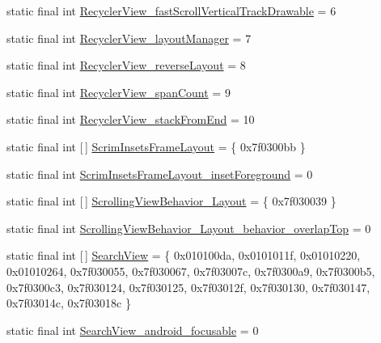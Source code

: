 \begin{DoxyCompactItemize}
\item 
static final int \mbox{\hyperlink{classandroid_1_1support_1_1design_1_1R_1_1styleable_a92c824253385475c40f5c93eb764e927}{Recycler\+View\+\_\+fast\+Scroll\+Vertical\+Track\+Drawable}} = 6
\item 
static final int \mbox{\hyperlink{classandroid_1_1support_1_1design_1_1R_1_1styleable_a675eed992758f2eceac3fc80f1ad3d85}{Recycler\+View\+\_\+layout\+Manager}} = 7
\item 
static final int \mbox{\hyperlink{classandroid_1_1support_1_1design_1_1R_1_1styleable_a09adeaf62a2a8f15978354fe728e2b7b}{Recycler\+View\+\_\+reverse\+Layout}} = 8
\item 
static final int \mbox{\hyperlink{classandroid_1_1support_1_1design_1_1R_1_1styleable_a24f02c9840efea0629dcb5d306a55600}{Recycler\+View\+\_\+span\+Count}} = 9
\item 
static final int \mbox{\hyperlink{classandroid_1_1support_1_1design_1_1R_1_1styleable_a1442d68f0c2f2be32bfea74e239de55e}{Recycler\+View\+\_\+stack\+From\+End}} = 10
\item 
static final int \mbox{[}$\,$\mbox{]} \mbox{\hyperlink{classandroid_1_1support_1_1design_1_1R_1_1styleable_a95b90e25d1cb72b4321bb1e78f92f75b}{Scrim\+Insets\+Frame\+Layout}} = \{ 0x7f0300bb \}
\item 
static final int \mbox{\hyperlink{classandroid_1_1support_1_1design_1_1R_1_1styleable_a843fb1a1e42f587cac983facff0ae7c0}{Scrim\+Insets\+Frame\+Layout\+\_\+inset\+Foreground}} = 0
\item 
static final int \mbox{[}$\,$\mbox{]} \mbox{\hyperlink{classandroid_1_1support_1_1design_1_1R_1_1styleable_a4277e39803c295c7c9cdbc5e862840c3}{Scrolling\+View\+Behavior\+\_\+\+Layout}} = \{ 0x7f030039 \}
\item 
static final int \mbox{\hyperlink{classandroid_1_1support_1_1design_1_1R_1_1styleable_ace54124d9ddc1d6c08aa85a9053cd0fb}{Scrolling\+View\+Behavior\+\_\+\+Layout\+\_\+behavior\+\_\+overlap\+Top}} = 0
\item 
static final int \mbox{[}$\,$\mbox{]} \mbox{\hyperlink{classandroid_1_1support_1_1design_1_1R_1_1styleable_a8f7e72dc1bf854e14c1be7dbc1cb7392}{Search\+View}} = \{ 0x010100da, 0x0101011f, 0x01010220, 0x01010264, 0x7f030055, 0x7f030067, 0x7f03007c, 0x7f0300a9, 0x7f0300b5, 0x7f0300c3, 0x7f030124, 0x7f030125, 0x7f03012f, 0x7f030130, 0x7f030147, 0x7f03014c, 0x7f03018c \}
\item 
static final int \mbox{\hyperlink{classandroid_1_1support_1_1design_1_1R_1_1styleable_a7836ab26d5f216a4c25fe349d89f98ee}{Search\+View\+\_\+android\+\_\+focusable}} = 0

\end{DoxyCompactItemize}
